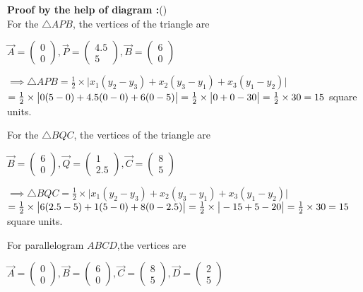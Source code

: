 \documentclass[12pt]{article}
\begin{document}
\textbf{Proof by the help of diagram :}()\\
For the $\triangle APB$, the vertices of the triangle are

   $\Vec{A}=\begin{pmatrix}
       0\\0
   \end{pmatrix},
   \Vec{P}=\begin{pmatrix}
       4.5\\5
   \end{pmatrix},
   \Vec{B}=\begin{pmatrix}
       6\\0
   \end{pmatrix}$

   
$\implies \triangle APB = \frac{1}{2}\times \big |x_1(y_2-y_3)+x_2(y_3-y_1)+x_3(y_1-y_2) \big|$\\
$ = \frac{1}{2} \times \big |0(5-0)+4.5(0-0)+6(0-5)\big|\\
 = \frac{1}{2} \times\big |0+0-30\big|\\
 =\frac{1}{2} \times30\\
 =15 $ square units.


 For the $\triangle BQC$, the vertices of the triangle are
 
   $\Vec{B}=\begin{pmatrix}
       6\\0
   \end{pmatrix},
   \Vec{Q}=\begin{pmatrix}
       1\\2.5
   \end{pmatrix},
   \Vec{C}=\begin{pmatrix}
       8\\5
   \end{pmatrix}$

   
$\implies \triangle BQC = \frac{1}{2}\times \big |x_1(y_2-y_3)+x_2(y_3-y_1)+x_3(y_1-y_2) \big|$\\
$ = \frac{1}{2} \times \big |6(2.5-5)+1(5-0)+8(0-2.5)\big|\\
 = \frac{1}{2} \times\big |-15+5-20\big|\\
 =\frac{1}{2} \times30\\
 =15 $ square units.

 
  For parallelogram $ABCD$,the vertices are

   $\Vec{A}=\begin{pmatrix}
       0\\0
   \end{pmatrix},
 \Vec{B}=\begin{pmatrix}
       6\\0
   \end{pmatrix},
   \Vec{C}=\begin{pmatrix}
       8\\5
   \end{pmatrix},
   \Vec{D}=\begin{pmatrix}
       2\\5
   \end{pmatrix}$
   
\end{document}

